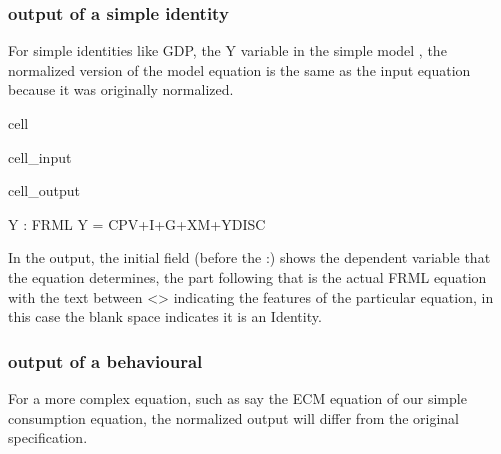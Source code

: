 \documentclass[letterpaper,10pt,english]{jupyterBook}
\begin{document}
\subsubsection{ output of a simple  identity}
\label{\detokenize{content/05_SimpleModel/SimpleModel:frml-output-of-a-simple-identity}}
\sphinxAtStartPar
For simple identities like GDP, the Y variable in the simple model , the normalized version of the model equation is the same as the input equation because it was originally normalized.

\begin{sphinxuseclass}{cell}\begin{sphinxVerbatimInput}

\begin{sphinxuseclass}{cell_input}
\begin{sphinxVerbatim}[commandchars=\\\{\}]
\PYG{p}{[}\PYG{p}{]}
\end{sphinxVerbatim}

\end{sphinxuseclass}\end{sphinxVerbatimInput}
\begin{sphinxVerbatimOutput}

\begin{sphinxuseclass}{cell_output}
\begin{sphinxVerbatim}[commandchars=\\\{\}]
Y : FRML \PYGZlt{}\PYGZgt{} Y = CPV+I+G+X\PYGZhy{}M+YDISC \PYGZdl{}
\end{sphinxVerbatim}

\end{sphinxuseclass}\end{sphinxVerbatimOutput}

\end{sphinxuseclass}
\sphinxAtStartPar
In the output, the initial field (before the :) shows  the dependent variable that the equation determines, the part following that is the actual FRML equation with the text between <> indicating the features of the particular equation, in this case the blank space indicates it is an Identity.


\subsubsection{ output of a behavioural}
\label{\detokenize{content/05_SimpleModel/SimpleModel:frml-output-of-a-behavioural}}
\sphinxAtStartPar
For a more complex equation, such as say the ECM equation of our simple consumption equation, the normalized output will differ from the original specification.
\end{document}
